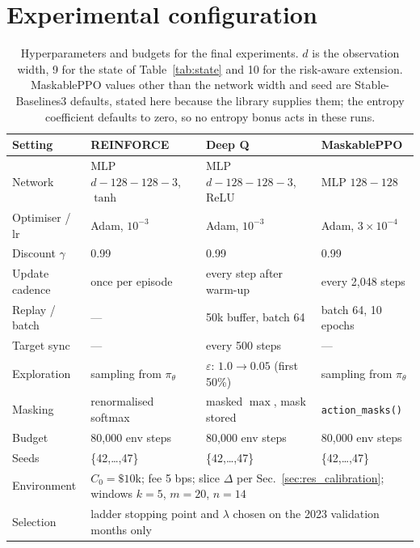 \section{Experimental configuration}
\label{sec:config}

\begin{table}[h]
\centering
\caption{Hyperparameters and budgets for the final experiments. $d$ is the
observation width, 9 for the state of Table~\ref{tab:state} and 10 for the
risk-aware extension. MaskablePPO values other than the network width and
seed are Stable-Baselines3 defaults, stated here because the library
supplies them; the entropy coefficient defaults to zero, so no entropy
bonus acts in these runs.}
\label{tab:hparams}
\small
\begin{tabular}{llll}
\toprule
\textbf{Setting} & \textbf{REINFORCE} & \textbf{Deep Q} & \textbf{MaskablePPO} \\
\midrule
Network & MLP $d{-}128{-}128{-}3$, $\tanh$ & MLP $d{-}128{-}128{-}3$, ReLU & MLP $128{-}128$ \\
Optimiser / lr & Adam, $10^{-3}$ & Adam, $10^{-3}$ & Adam, $3{\times}10^{-4}$ \\
Discount $\gamma$ & 0.99 & 0.99 & 0.99 \\
Update cadence & once per episode & every step after warm-up & every 2{,}048 steps \\
Replay / batch & --- & 50k buffer, batch 64 & batch 64, 10 epochs \\
Target sync & --- & every 500 steps & --- \\
Exploration & sampling from $\pi_\theta$ & $\varepsilon$: $1.0 \to 0.05$ (first 50\%) & sampling from $\pi_\theta$ \\
Masking & renormalised softmax & masked $\max$, mask stored & \texttt{action\_masks()} \\
Budget & 80{,}000 env steps & 80{,}000 env steps & 80{,}000 env steps \\
Seeds & \{42,\dots,47\} & \{42,\dots,47\} & \{42,\dots,47\} \\
\midrule
Environment & \multicolumn{3}{l}{$C_0 = \$10$k; fee 5 bps; slice $\Delta$ per
  Sec.~\ref{sec:res_calibration}; windows $k{=}5$, $m{=}20$, $n{=}14$} \\
Selection & \multicolumn{3}{l}{ladder stopping point and $\lambda$ chosen on the
  2023 validation months only} \\
\bottomrule
\end{tabular}
\end{table}

